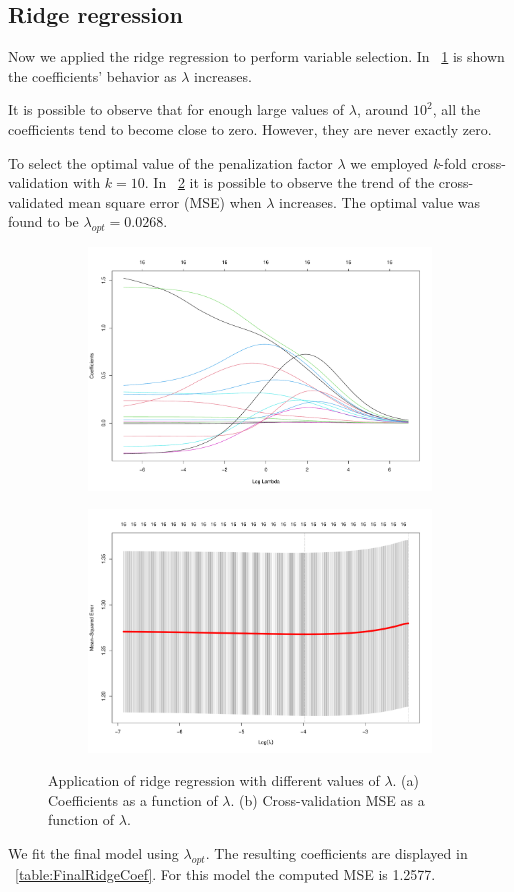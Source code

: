 \subsection{Ridge regression}

Now we applied the ridge regression to perform variable selection. In \Fig~\ref{fig:RidgeCoefVsLambda} is shown the coefficients' behavior as $\lambda$ increases. 

It is possible to observe that for enough large values of $\lambda$, around $10^2$, all the coefficients tend to become close to zero. However, they are never exactly zero.

To select the optimal value of the penalization factor $\lambda$ we employed \textit{k}-fold cross-validation with $\textit{k}=10$. In \Fig~\ref{fig:RidgeCvPlot} it is possible to observe the trend of the cross-validated mean square error (MSE) when $\lambda$ increases. The optimal value was found to be $\lambda_{opt} = 0.0268$.

\begin{figure}[H]
	\centering
	\begin{subfigure}{.5\textwidth}
		\centering
		\includegraphics[width=0.7\linewidth]{ImageFiles/Regression/Ridge/RidgeCoefVsLambda.pdf}
		\caption{}
		\label{fig:RidgeCoefVsLambda}
	\end{subfigure}%
	\begin{subfigure}{.5\textwidth}
		\centering
		\includegraphics[width=0.7\linewidth]{ImageFiles/Regression/Ridge/RidgeCvPlot.pdf}
		\caption{}
		\label{fig:RidgeCvPlot}
	\end{subfigure}
	\caption{Application of ridge regression with different values of $\lambda$. (a) Coefficients as a function of $\lambda$. (b) Cross-validation MSE as a function of $\lambda$.}
	\label{fig:FinalFSSM}
\end{figure}

We fit the final model using $\lambda_{opt}$. The resulting coefficients are displayed in \Tab~\ref{table:FinalRidgeCoef}. For this model the computed MSE is 1.2577.

